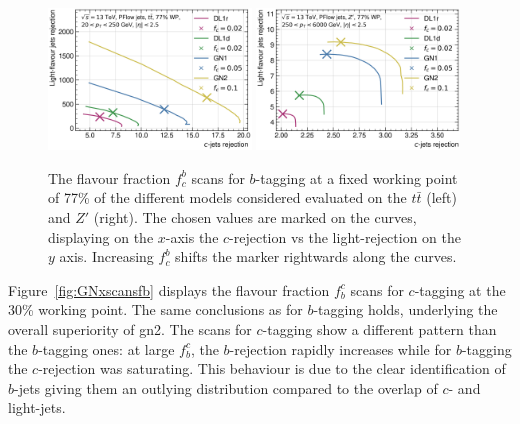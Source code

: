 \begin{figure}[h!]
  \centering
  \includegraphics[width=0.48\textwidth]{Images/FTAG/GN/GN2/fraction_scans/FractionScanPlot_tt.png}
  \includegraphics[width=0.48\textwidth]{Images/FTAG/GN/GN2/fraction_scans/FractionScanPlot_zp.png}
  \caption{The flavour fraction $f^b_c$ scans for $b$-tagging at a fixed working point of 77\% of the different models considered evaluated on the $t\bar{t}$ (left) and $Z'$ (right). The chosen values are marked on the curves, displaying on the $x$-axis the $c$-rejection vs the light-rejection on the $y$ axis. Increasing $f^b_c$ shifts the marker rightwards along the curves. }
  \label{fig:GNxscansfc}
\end{figure} 

Figure~\ref{fig:GNxscansfb} displays the flavour fraction $f^c_b$ scans for $c$-tagging at the 30\% working point. The same conclusions as for $b$-tagging holds, underlying the overall superiority of \gls{gn2}. The scans for $c$-tagging show a different pattern than the $b$-tagging ones: at large $f^c_b$, the $b$-rejection rapidly increases while for $b$-tagging the $c$-rejection was saturating. This behaviour is due to the clear identification of $b$-jets giving them an outlying distribution compared to the overlap of $c$- and light-jets. \\

